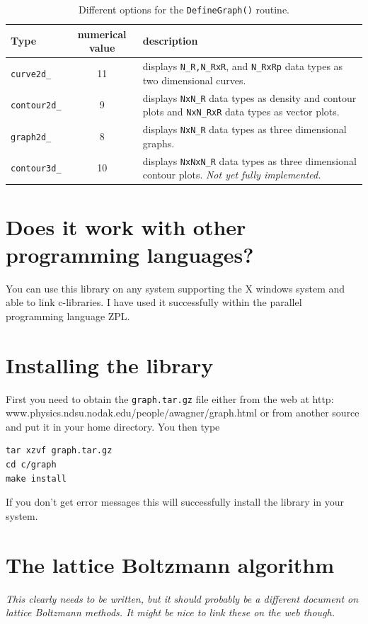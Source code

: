 \documentclass[12pt,letterpaper]{article}
\begin{document}
\begin{table}
\begin{center}
\begin{tabular}{|l|c|p{7cm}|}
\hline
Type  & numerical value & description\\
\hline
\texttt{curve2d\_} & 11  & displays \texttt{N\_R,N\_RxR}, and
                          \texttt{N\_RxRp} data types as two
			  dimensional curves.\\
\texttt{contour2d\_} & 9 & displays \texttt{NxN\_R} data types as
                          density and contour plots and
			  \texttt{NxN\_RxR} data types as vector plots.\\
\texttt{graph2d\_}  & 8  & displays \texttt{NxN\_R} data types as three
                          dimensional graphs.\\ 
\texttt{contour3d\_} & 10& displays \texttt{NxNxN\_R} data types as
                          three dimensional contour plots. \textit{Not
			    yet fully implemented.} \\
\hline
\end{tabular}
\end{center}
\label{graphtable}
\caption{Different options for the \texttt{DefineGraph()} routine.}
\end{table}


\section{Does it work with other programming languages?}
You can use this library on any system supporting the X windows system
and able to link c-libraries. I have used it successfully within the
parallel programming language ZPL.

\appendix

\section{Installing the library}
\label{install}
First you need to obtain the \texttt{graph.tar.gz} file either from
the web at http:\\www.physics.ndsu.nodak.edu/people/awagner/graph.html
or from another source and put it in your home directory. You then type
\begin{verbatim}
tar xzvf graph.tar.gz
cd c/graph
make install
\end{verbatim}
If you don't get error messages this will successfully install the
library in your system.

\section{The lattice Boltzmann algorithm}
\label{1d_diff_LB}
\textit{This clearly needs to be written, but it should probably be a
  different document on lattice Boltzmann methods. It might be nice to
  link these on the web though.}
\end{document}
